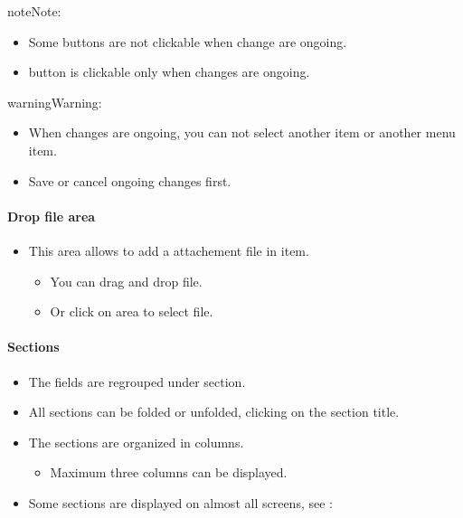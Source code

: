 \documentclass[letterpaper,10pt,english]{sphinxmanual}
\begin{document}
\begin{notice}{note}{Note:}\begin{itemize}
\item {} 
Some buttons are not clickable when change are ongoing.

\item {} 
 button is clickable only when changes are ongoing.

\end{itemize}
\end{notice}

\begin{notice}{warning}{Warning:}\begin{itemize}
\item {} 
When changes are ongoing, you can not select another item or another menu item.

\item {} 
Save or cancel ongoing changes first.

\end{itemize}
\end{notice}
\paragraph{Drop file area}
\begin{itemize}
\item {} 
This area allows to add a attachement file in item.
\begin{itemize}
\item {} 
You can drag and drop file.

\item {} 
Or click on area to select file.

\end{itemize}

\end{itemize}
\paragraph{Sections}
\begin{itemize}
\item {} 
The fields are regrouped under section.

\item {} 
All sections can be folded or unfolded, clicking on the section title.

\item {} 
The sections are organized in columns.
\begin{itemize}
\item {} 
Maximum three columns can be displayed.

\end{itemize}

\item {} 
Some sections are displayed on almost all screens, see : {\hyperref[Gui:gui-sections-label]{\emph{}}}

\end{itemize}
\newpage
\end{document}
